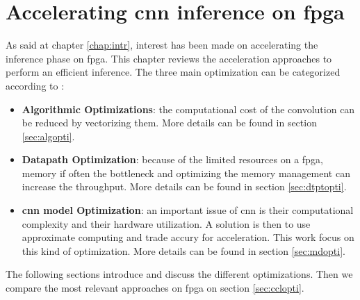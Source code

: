 \chapter{Accelerating \acrshort{cnn} inference on \acrshort{fpga}}
\label{chap:inf}
As said at chapter \ref{chap:intr}, interest has been made on accelerating the inference phase on \acrshort{fpga}. This chapter reviews the acceleration approaches to perform an efficient inference. \newline \newline
The three main optimization can be categorized according to \cite{abdelouahab_accelerating_2018}:
\begin{itemize}
    \item \textbf{Algorithmic Optimizations}: the computational cost of the convolution can be reduced by vectorizing them. More details can be found in section \ref{sec:algopti}.
    \item \textbf{Datapath Optimization}: because of the limited resources on a \acrshort{fpga}, memory if often the bottleneck and optimizing the memory management can increase the throughput. More details can be found in section \ref{sec:dtptopti}.
    \item \textbf{\acrshort{cnn} model Optimization}: an important issue of \acrshort{cnn} is their computational complexity and their hardware utilization. A solution is then to use approximate computing and trade accury for acceleration. This work focus on this kind of optimization. More details can be found in section \ref{sec:mdopti}.
\end{itemize}
The following sections introduce and discuss the different optimizations. Then we compare the most relevant approaches on \acrshort{fpga} on section \ref{sec:cclopti}.




